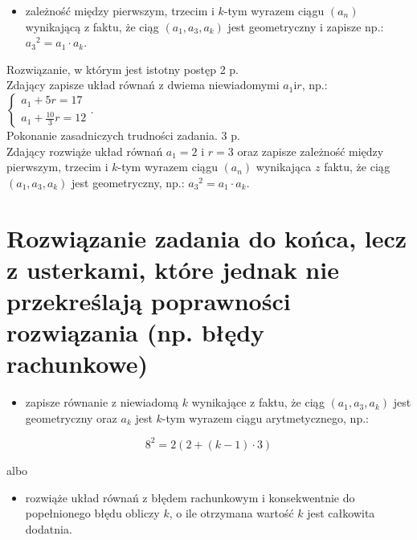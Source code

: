 \documentclass[10pt]{article}
\begin{document}
\begin{itemize}
  \item zależność między pierwszym, trzecim i $k$-tym wyrazem ciągu $\left(a_{n}\right)$ wynikającą z faktu, że ciąg $\left(a_{1}, a_{3}, a_{k}\right)$ jest geometryczny i zapisze np.: $a_{3}{ }^{2}=a_{1} \cdot a_{k}$.
\end{itemize}

Rozwiązanie, w którym jest istotny postęp 2 p.\\
Zdający zapisze układ równań z dwiema niewiadomymi $a_{1} \mathrm{i} r$, np.: $\left\{\begin{array}{l}a_{1}+5 r=17 \\ a_{1}+\frac{10}{3} r=12\end{array}\right.$.\\
Pokonanie zasadniczych trudności zadania. 3 p.\\
Zdający rozwiąże układ równań $a_{1}=2$ i $r=3$ oraz zapisze zależność między pierwszym, trzecim i $k$-tym wyrazem ciągu $\left(a_{n}\right)$ wynikająca $z$ faktu, że ciąg $\left(a_{1}, a_{3}, a_{k}\right)$ jest geometryczny, np.: $a_{3}{ }^{2}=a_{1} \cdot a_{k}$.

\section*{Rozwiązanie zadania do końca, lecz z usterkami, które jednak nie przekreślają poprawności rozwiązania (np. błędy rachunkowe)}
\begin{itemize}
  \item zapisze równanie z niewiadomą $k$ wynikające z faktu, że ciąg $\left(a_{1}, a_{3}, a_{k}\right)$ jest geometryczny oraz $a_{k}$ jest $k$-tym wyrazem ciągu arytmetycznego, np.:
\end{itemize}

$$
8^{2}=2(2+(k-1) \cdot 3)
$$

albo

\begin{itemize}
  \item rozwiąże układ równań z błędem rachunkowym i konsekwentnie do popełnionego błędu obliczy $k$, o ile otrzymana wartość $k$ jest całkowita dodatnia.
\end{itemize}
\end{document}
